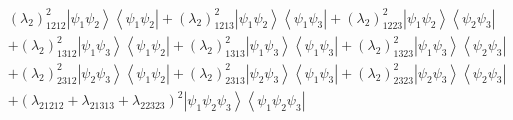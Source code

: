 \documentclass[aps,preprint]{revtex4}%
\begin{document}
\begin{align}
& \left(  \lambda_{2}\right)  _{1212}^{2}\left\vert \psi_{1}\psi
_{2}\right\rangle \left\langle \psi_{1}\psi_{2}\right\vert +\left(
\lambda_{2}\right)  _{1213}^{2}\left\vert \psi_{1}\psi_{2}\right\rangle
\left\langle \psi_{1}\psi_{3}\right\vert +\left(  \lambda_{2}\right)
_{1223}^{2}\left\vert \psi_{1}\psi_{2}\right\rangle \left\langle \psi_{2}%
\psi_{3}\right\vert \nonumber\\
& +\left(  \lambda_{2}\right)  _{1312}^{2}\left\vert \psi_{1}\psi
_{3}\right\rangle \left\langle \psi_{1}\psi_{2}\right\vert +\left(
\lambda_{2}\right)  _{1313}^{2}\left\vert \psi_{1}\psi_{3}\right\rangle
\left\langle \psi_{1}\psi_{3}\right\vert +\left(  \lambda_{2}\right)
_{1323}^{2}\left\vert \psi_{1}\psi_{3}\right\rangle \left\langle \psi_{2}%
\psi_{3}\right\vert \nonumber\\
& +\left(  \lambda_{2}\right)  _{2312}^{2}\left\vert \psi_{2}\psi
_{3}\right\rangle \left\langle \psi_{1}\psi_{2}\right\vert +\left(
\lambda_{2}\right)  _{2313}^{2}\left\vert \psi_{2}\psi_{3}\right\rangle
\left\langle \psi_{1}\psi_{3}\right\vert +\left(  \lambda_{2}\right)
_{2323}^{2}\left\vert \psi_{2}\psi_{3}\right\rangle \left\langle \psi_{2}%
\psi_{3}\right\vert \nonumber\\
& +\left(  \lambda_{21212}+\lambda_{21313}+\lambda_{22323}\right)
^{2}\left\vert \psi_{1}\psi_{2}\psi_{3}\right\rangle \left\langle \psi_{1}%
\psi_{2}\psi_{3}\right\vert
\end{align}
\end{document}
